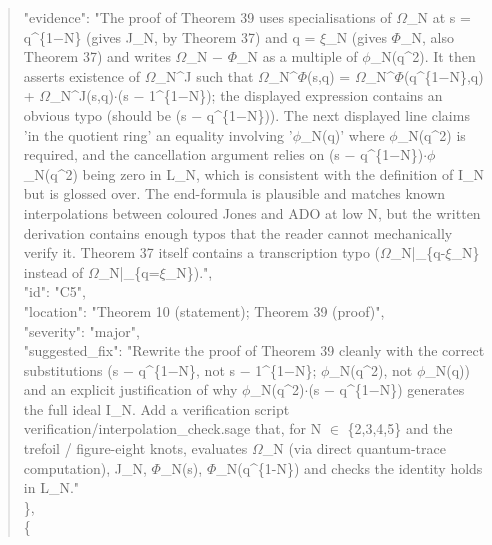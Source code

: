 \documentclass[11pt]{article}
\begin{document}
\begin{quote}
      "evidence": "The proof of Theorem 39 uses specialisations of \ensuremath{\Omega}\_N at s = q\^{}\{1\ensuremath{-}N\} (gives J\_N, by Theorem 37) and q = \ensuremath{\xi}\_N (gives \ensuremath{\Phi}\_N, also Theorem 37) and writes \ensuremath{\Omega}\_N \ensuremath{-} \ensuremath{\Phi}\_N as a multiple of \ensuremath{\phi}\_N(q\^{}2). It then asserts existence of \ensuremath{\Omega}\_N\^{}J such that \ensuremath{\Omega}\_N\^{}\ensuremath{\Phi}(s,q) = \ensuremath{\Omega}\_N\^{}\ensuremath{\Phi}(q\^{}\{1\ensuremath{-}N\},q) + \ensuremath{\Omega}\_N\^{}J(s,q)\ensuremath{\cdot}(s \ensuremath{-} 1\^{}\{1\ensuremath{-}N\}); the displayed expression contains an obvious typo (should be (s \ensuremath{-} q\^{}\{1\ensuremath{-}N\})). The next displayed line claims 'in the quotient ring' an equality involving '\ensuremath{\phi}\_N(q)' where \ensuremath{\phi}\_N(q\^{}2) is required, and the cancellation argument relies on (s \ensuremath{-} q\^{}\{1\ensuremath{-}N\})\ensuremath{\cdot}\ensuremath{\phi}\_N(q\^{}2) being zero in L\_N, which is consistent with the definition of I\_N but is glossed over. The end-formula is plausible and matches known interpolations between coloured Jones and ADO at low N, but the written derivation contains enough typos that the reader cannot mechanically verify it. Theorem 37 itself contains a transcription typo (\ensuremath{\Omega}\_N|\_\{q-\ensuremath{\xi}\_N\} instead of \ensuremath{\Omega}\_N|\_\{q=\ensuremath{\xi}\_N\}).",\\
      "id": "C5",\\
      "location": "Theorem 10 (statement); Theorem 39 (proof)",\\
      "severity": "major",\\
      "suggested\_fix": "Rewrite the proof of Theorem 39 cleanly with the correct substitutions (s \ensuremath{-} q\^{}\{1\ensuremath{-}N\}, not s \ensuremath{-} 1\^{}\{1\ensuremath{-}N\}; \ensuremath{\phi}\_N(q\^{}2), not \ensuremath{\phi}\_N(q)) and an explicit justification of why \ensuremath{\phi}\_N(q\^{}2)\ensuremath{\cdot}(s \ensuremath{-} q\^{}\{1\ensuremath{-}N\}) generates the full ideal I\_N. Add a verification script verification/interpolation\_check.sage that, for N \ensuremath{\in} \{2,3,4,5\} and the trefoil / figure-eight knots, evaluates \ensuremath{\Omega}\_N (via direct quantum-trace computation), J\_N, \ensuremath{\Phi}\_N(s), \ensuremath{\Phi}\_N(q\^{}\{1-N\}) and checks the identity holds in L\_N."\\
    \},\\
    \{\\

\end{quote}
\end{document}
